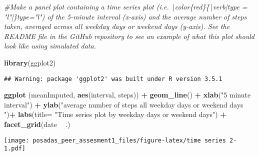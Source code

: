 \documentclass[]{article}
\newenvironment{Shaded}{\begin{snugshade}}{\end{snugshade}}
\newcommand{\KeywordTok}[1]{\textcolor[rgb]{0.13,0.29,0.53}{\textbf{#1}}}
\newcommand{\DataTypeTok}[1]{\textcolor[rgb]{0.13,0.29,0.53}{#1}}
\newcommand{\StringTok}[1]{\textcolor[rgb]{0.31,0.60,0.02}{#1}}
\newcommand{\CommentTok}[1]{\textcolor[rgb]{0.56,0.35,0.01}{\textit{#1}}}
\newcommand{\OperatorTok}[1]{\textcolor[rgb]{0.81,0.36,0.00}{\textbf{#1}}}
\newcommand{\NormalTok}[1]{#1}
\begin{document}
\begin{Shaded}
\begin{Highlighting}[]
\CommentTok{#Make a panel plot containing a time series plot (i.e. \textbackslash{}color\{red\}\{\textbackslash{}verb|type = "l"|\}type="l") of the 5-minute interval (x-axis) and the average number of steps taken, averaged across all weekday days or weekend days (y-axis). See the README file in the GitHub repository to see an example of what this plot should look like using simulated data.}


\KeywordTok{library}\NormalTok{(ggplot2)}
\end{Highlighting}
\end{Shaded}

\begin{verbatim}
## Warning: package 'ggplot2' was built under R version 3.5.1
\end{verbatim}

\begin{Shaded}
\begin{Highlighting}[]
\KeywordTok{ggplot}\NormalTok{ (meanImputed, }\KeywordTok{aes}\NormalTok{(interval, steps)) }\OperatorTok{+}\StringTok{ }\KeywordTok{geom_line}\NormalTok{() }\OperatorTok{+}\StringTok{ }\KeywordTok{xlab}\NormalTok{(}\StringTok{"5 minute interval"}\NormalTok{) }\OperatorTok{+}\StringTok{ }\KeywordTok{ylab}\NormalTok{(}\StringTok{"average number of steps all weekday days or weekend days "}\NormalTok{)}\OperatorTok{+}\StringTok{ }\KeywordTok{labs}\NormalTok{(}\DataTypeTok{title=} \StringTok{"Time series plot by weekday days or weekend days"}\NormalTok{) }\OperatorTok{+}\StringTok{ }\KeywordTok{facet_grid}\NormalTok{(date }\OperatorTok{~}\StringTok{ }\NormalTok{.)}
\end{Highlighting}
\end{Shaded}

\texttt{[image: posadas\_peer\_assesment1\_files/figure-latex/time series 2-1.pdf]}
\end{document}
